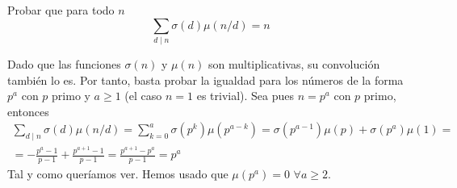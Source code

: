 \documentclass[twoside]{article}
\begin{document}
\begin{ejercicio}{3}
Probar que para todo $n$
\[
\sum_{d\mid n} \sigma(d)\mu(n/d)=n 
\]
\begin{sol}
Dado que las funciones $\sigma(n)$ y $\mu(n)$ son multiplicativas, su convolución también lo es. Por tanto, basta probar la igualdad para los números de la forma $p^a$ con $p$ primo y $a\geq 1$ (el caso $n=1$ es trivial). Sea pues $n=p^a$ con $p$ primo, entonces
\begin{gather*}
\sum_{d\mid n} \sigma(d)\mu(n/d) = \sum_{k=0}^a \sigma(p^k)\mu(p^{a-k}) = \sigma(p^{a-1})\mu(p) + \sigma(p^a)\mu(1) = \\
=  -\frac{p^a - 1}{p-1} +\frac{p^{a+1}-1}{p-1} = \frac{p^{a+1}-p^a}{p-1} = p^a
\end{gather*}
Tal y como queríamos ver. Hemos usado que $\mu(p^a)=0$ $\forall a \geq 2$.
\end{sol}
\end{ejercicio}
\newpage
\end{document}
